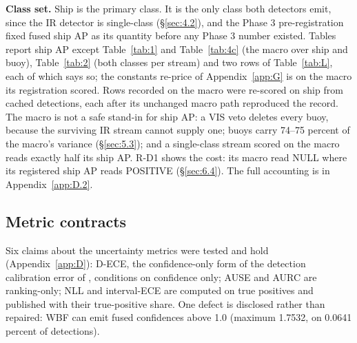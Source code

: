 \documentclass[10pt]{article}
\begin{document}
\textbf{Class set.} Ship is the primary class. It is the only class both detectors emit, since the IR detector is single-class (\S\ref{sec:4.2}), and the Phase 3 pre-registration fixed fused ship AP as its quantity before any Phase 3 number existed. Tables report ship AP except Table~\ref{tab:1} and Table~\ref{tab:4c} (the macro over ship and buoy), Table~\ref{tab:2} (both classes per stream) and two rows of Table~\ref{tab:L}, each of which says so; the constants re-price of Appendix~\ref{app:G} is on the macro its registration scored. Rows recorded on the macro were re-scored on ship from cached detections, each after its unchanged macro path reproduced the record. The macro is not a safe stand-in for ship AP: a VIS veto deletes every buoy, because the surviving IR stream cannot supply one; buoys carry 74--75 percent of the macro's variance (\S\ref{sec:5.3}); and a single-class stream scored on the macro reads exactly half its ship AP. R-D1 shows the cost: its macro read NULL where its registered ship AP reads POSITIVE (\S\ref{sec:6.4}). The full accounting is in Appendix~\ref{app:D.2}.

\subsection{Metric contracts}\label{sec:5.6}
Six claims about the uncertainty metrics were tested and hold (Appendix~\ref{app:D}): D-ECE, the confidence-only form of the detection calibration error of \citet{kuppers2020multivariate}, conditions on confidence only; AUSE \citep{ilg2018uncertainty} and AURC \citep{geifman2019biasreduced} are ranking-only; NLL and interval-ECE are computed on true positives and published with their true-positive share. One defect is disclosed rather than repaired: WBF can emit fused confidences above 1.0 (maximum 1.7532, on 0.0641 percent of detections).
\end{document}

